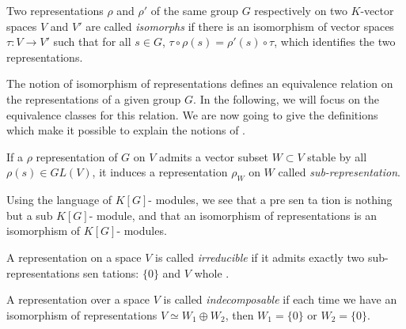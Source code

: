  
 
\begin{defn}
\label{defn-representation-isomorphs}
Two representations $ \rho $ and $ \rho'$ of the same group $G$ respectively on two $K$-vector spaces $V$ and $ V' $ are called \textit{isomorphs} if there is an isomorphism of vector spaces $ \tau: V \rightarrow V'$ such that for all $ s \in G $, $ \tau \circ \rho (s) = \rho' (s) \circ \tau $, which identifies the two representations.
\end{defn}
The notion of isomorphism of representations defines an equivalence relation on the representations of a given group $G$. In the following, we will focus on the equivalence classes for this relation. We are now going to give the definitions which make it possible to explain the notions of .
 
\begin{defn}
\label{defn-sub-representation}
 If a $ \rho $ representation of $G$ on $V$ admits a vector subset $ W \subset V $ stable by all $ \rho (s) \in GL (V) $, it induces a representation $ \rho_W $ on $ W $ called \textit{sub-representation}.
\end{defn}
 
 
\begin{rem}
 Using the language of $ K[G]$- modules, we see that a \-pre \-sen \-ta \-tion is nothing but a sub $ K[G]$- module, and that an isomorphism of representations is an isomorphism of $ K[G]$- modules.
\end{rem}
 
 
\begin{defn}
 A representation on a space $V$ is called \textit{irreducible} if it admits exactly two sub-representations \-sen \-tations: $ \{0\} $ and $V$ whole .
\end{defn}
 
 
\begin{defn}
 A representation over a space $V$ is called \textit{indecomposable} if each time we have an isomorphism of representations $ V \simeq W_1 \oplus W_2 $, then $ W_1 = \{0\} $ or $ W_2 = \{0\} $.
\end{defn}
 
